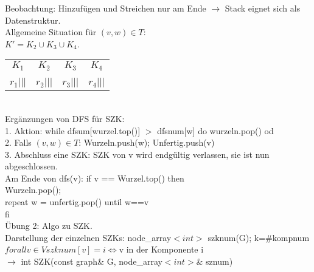 \documentclass[a4paper]{article}
\newcommand{\pl}{\hspace*{1cm}}
\begin{document}
Beobachtung: Hinzufügen und Streichen nur am Ende $\rightarrow$ Stack eignet sich als Datenstruktur.\\
Allgemeine Situation für $(v,w)\in T$:\\
$K' = K_2\cup K_3\cup K_4$.\\
\begin{tabular}{c|c|c|c}
$K_1$&$K_2$&$K_3$&$K_4$\\
$r_1$|||&$r_2$|||&$r_3$|||&$r_4$|||\\
\end{tabular}\\
Ergänzungen von DFS für SZK:\\
1. Aktion: while dfsum[wurzel.top()] $>$ dfsnum[w] do wurzeln.pop() od\\
2. Falls $(v,w)\in T$: Wurzeln.push(w); Unfertig.push(v)\\
3. Abschluss eine SZK: SZK von v wird endgültig verlassen, sie ist nun abgeschlossen.\\
\pl Am Ende von dfs(v): if v == Wurzel.top() then \\
\pl \pl Wurzeln.pop();\\
\pl \pl repeat w = unfertig.pop() until w==v\\
\pl fi\\
Übung 2: Algo zu SZK.\\
Darstellung der einzelnen SZKs: node\_array$<int>$ szknum(G); k=\#kompnum $forall v\in V szknum[v] = i \Leftrightarrow $v in der Komponente i\\
$\rightarrow$  int SZK(const graph\& G, node\_array$<int>$\& sznum)\\
\end{document}
